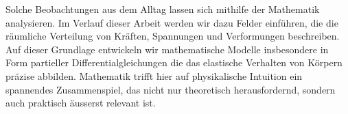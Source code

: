 Solche Beobachtungen aus dem Alltag lassen sich mithilfe der Mathematik analysieren.
Im Verlauf dieser Arbeit werden wir dazu Felder einführen, die die
räumliche Verteilung von Kräften, Spannungen und Verformungen beschreiben.
%
%
%
Auf dieser Grundlage entwickeln wir mathematische Modelle insbesondere
in Form partieller Differentialgleichungen die das elastische Verhalten
von Körpern präzise abbilden.
%
%
Mathematik trifft hier auf physikalische Intuition ein spannendes
Zusammenspiel, das nicht nur theoretisch herausfordernd, sondern auch
praktisch äusserst relevant ist.
